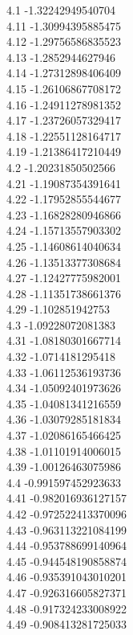 {4.1	-1.32242949540704\\
4.11	-1.30994395885475\\
4.12	-1.29756586835523\\
4.13	-1.2852944627946\\
4.14	-1.27312898406409\\
4.15	-1.26106867708172\\
4.16	-1.24911278981352\\
4.17	-1.23726057329417\\
4.18	-1.22551128164717\\
4.19	-1.21386417210449\\
4.2	-1.20231850502566\\
4.21	-1.19087354391641\\
4.22	-1.17952855544677\\
4.23	-1.16828280946866\\
4.24	-1.15713557903302\\
4.25	-1.14608614040634\\
4.26	-1.13513377308684\\
4.27	-1.12427775982001\\
4.28	-1.11351738661376\\
4.29	-1.102851942753\\
4.3	-1.09228072081383\\
4.31	-1.08180301667714\\
4.32	-1.0714181295418\\
4.33	-1.06112536193736\\
4.34	-1.05092401973626\\
4.35	-1.04081341216559\\
4.36	-1.03079285181834\\
4.37	-1.02086165466425\\
4.38	-1.01101914006015\\
4.39	-1.00126463075986\\
4.4	-0.991597452923633\\
4.41	-0.982016936127157\\
4.42	-0.972522413370096\\
4.43	-0.963113221084199\\
4.44	-0.953788699140964\\
4.45	-0.944548190858874\\
4.46	-0.935391043010201\\
4.47	-0.926316605827371\\
4.48	-0.917324233008922\\
4.49	-0.908413281725033\\
}
